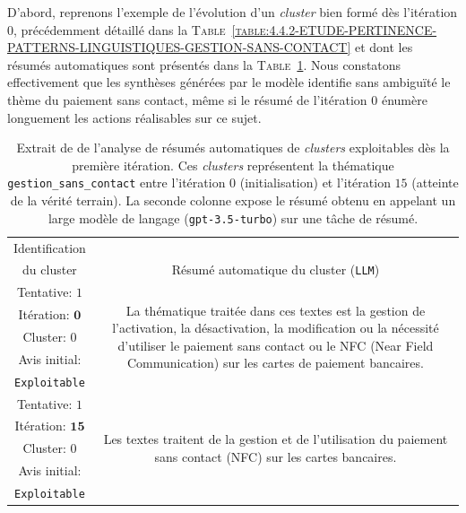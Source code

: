 			D'abord, reprenons l'exemple de l'évolution d'un \textit{cluster} bien formé dès l'itération $0$, précédemment détaillé dans la \textsc{Table~\ref{table:4.4.2-ETUDE-PERTINENCE-PATTERNS-LINGUISTIQUES-GESTION-SANS-CONTACT}} et dont les résumés automatiques sont présentés dans la \textsc{Table~\ref{table:4.4.3-ETUDE-PERTINENCE-RESUME-AUTOMATIQUE-GESTION-SANS-CONTACT}}.
			Nous constatons effectivement que les synthèses générées par le modèle identifie sans ambiguïté le thème du paiement sans contact, même si le résumé de l'itération $0$ énumère longuement les actions réalisables sur ce sujet.
			\begin{table}[!htb]
				\begin{center}
				\def\arraystretch{0.8}  %
				\begin{tabular}{|c|c|}
				
				\hline
				\rowcolor{colorTableHeader!15}
				Identification
					&
					\tabularnewline
				\rowcolor{colorTableHeader!15}
				du cluster
					& \multirow{-2}{*}{
						Résumé automatique du cluster (\texttt{LLM})
					}
					\tabularnewline
					\hline
				
				{ \footnotesize Tentative: $1$ }
					& \multirow{5}{*}{\parbox{12cm}{
						\footnotesize La thématique traitée dans ces textes est la gestion de l'activation, la désactivation, la modification ou la nécessité d'utiliser le paiement sans contact ou le NFC (Near Field Communication) sur les cartes de paiement bancaires.
					}}
					\tabularnewline
				{ \footnotesize Itération: $\textbf{0}$ }
					&
					\tabularnewline
				{ \footnotesize Cluster: $0$ }
					&
					\tabularnewline
				{ \footnotesize Avis initial: }
					&
					\tabularnewline
				{ \footnotesize \color{colorDarkPastelGreen} \texttt{Exploitable} }
					&
					\tabularnewline
					\hline
					
				{ \footnotesize Tentative: $1$ }
					& \multirow{5}{*}{\parbox{12cm}{
						\footnotesize Les textes traitent de la gestion et de l'utilisation du paiement sans contact (NFC) sur les cartes bancaires.
					}}
					\tabularnewline
				{ \footnotesize Itération: $\textbf{15}$ }
					&
					\tabularnewline
				{ \footnotesize Cluster: $0$ }
					& 
					\tabularnewline
				{ \footnotesize Avis initial: }
					&
					\tabularnewline
				{ \footnotesize \color{colorDarkPastelGreen} \texttt{Exploitable} }
					&
					\tabularnewline
					\hline
					
				\end{tabular}
				\end{center}
				\caption{
					Extrait de de l'analyse de résumés automatiques de \textit{clusters} exploitables dès la première itération.
					Ces \textit{clusters} représentent la thématique \texttt{gestion\_sans\_contact} entre l'itération $0$ (initialisation) et l'itération $15$ (atteinte de la vérité terrain).
					La seconde colonne expose le résumé obtenu en appelant un large modèle de langage (\texttt{gpt-3.5-turbo}) sur une tâche de résumé.
				}
				\label{table:4.4.3-ETUDE-PERTINENCE-RESUME-AUTOMATIQUE-GESTION-SANS-CONTACT}
			\end{table}
			
